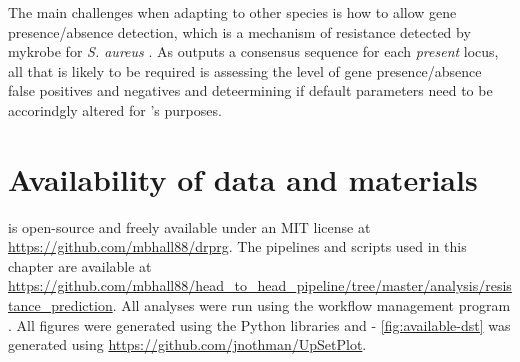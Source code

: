 The main challenges when adapting to other species is how to allow gene presence/absence detection, which is a mechanism of resistance detected by mykrobe for \textit{S. aureus} \cite{bradley2015}. As \pandora{} outputs a consensus sequence for each \emph{present} locus, all that is likely to be required is assessing the level of gene presence/absence false positives and negatives and deteermining if default parameters need to be accorindgly altered for \drprg{}'s purposes.

\section{Availability of data and materials}

\drprg{} is open-source and freely available under an MIT license at \url{https://github.com/mbhall88/drprg}. The pipelines and scripts used in this chapter are available at \url{https://github.com/mbhall88/head_to_head_pipeline/tree/master/analysis/resistance_prediction}. All analyses were run using the workflow management program  \cite{snakemake2021}. All figures were generated using the Python libraries  \cite{matplotlib} and  \cite{seaborn} - \autoref{fig:available-dst} was generated using \url{https://github.com/jnothman/UpSetPlot}.

